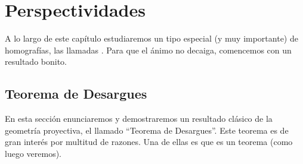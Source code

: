 \chapter{Perspectividades}
\label{C7}
A lo largo de este capítulo estudiaremos un tipo especial (y muy importante) de homografías, las llamadas . Para que el ánimo no decaiga, comencemos con un resultado bonito.
\section{Teorema de Desargues}
\label{C7_Desargues}
En esta sección enunciaremos y demostraremos un resultado clásico de la geometría proyectiva, el llamado ``Teorema de Desargues''. Este teorema es de gran interés por multitud de razones. Una de ellas es que es un teorema  (como luego veremos).

